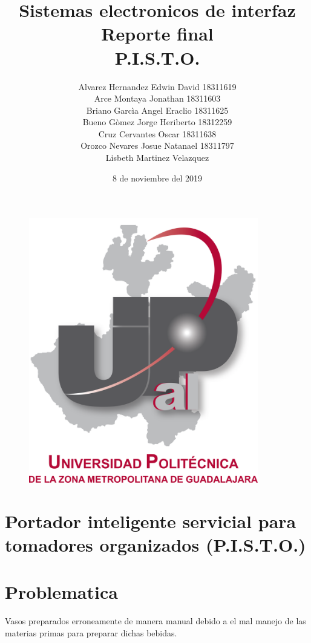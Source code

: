 \documentclass[12pt,a4paper]{article}
\begin{document}
\title{\textbf{Sistemas electronicos de interfaz\\Reporte final\\P.I.S.T.O.}}
\author{Alvarez Hernandez Edwin David 18311619\\Arce Montaya Jonathan 18311603\\Briano Garcìa Angel Eraclio 18311625\\Bueno Gòmez Jorge Heriberto 18312259\\Cruz Cervantes Oscar 18311638\\Orozco Nevares Josue Natanael 18311797\\Lisbeth Martinez Velazquez}
\date{8 de noviembre del 2019}

\begin{figure}
\centering
\includegraphics[width=10cm]{UPCDLZMDG5783-logo.png} 
\end{figure}
\maketitle
\newpage

\section{Portador inteligente servicial para tomadores organizados (P.I.S.T.O.)}

\section{Problematica}
Vasos preparados erroneamente de manera manual debido a el mal manejo de las materias primas para preparar dichas bebidas.
\end{document}
